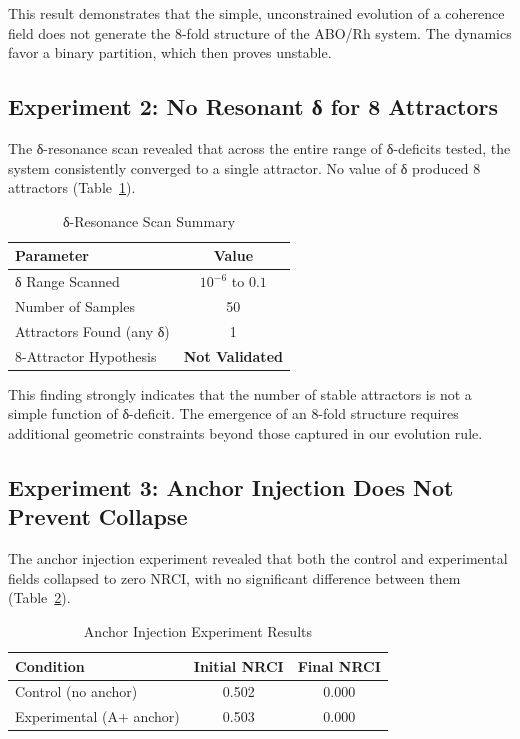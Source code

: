 \documentclass[11pt]{article}
\begin{document}
This result demonstrates that the simple, unconstrained evolution of a coherence field does not generate the 8-fold structure of the ABO/Rh system. The dynamics favor a binary partition, which then proves unstable.

\subsection{Experiment 2: No Resonant δ for 8 Attractors}

The δ-resonance scan revealed that across the entire range of δ-deficits tested, the system consistently converged to a single attractor. No value of δ produced 8 attractors (Table~\ref{tab:exp2_summary}).

\begin{table}[h!]
\centering
\caption{δ-Resonance Scan Summary}
\begin{tabular}{lc}
\toprule
\textbf{Parameter} & \textbf{Value} \\
\midrule
δ Range Scanned & $10^{-6}$ to $0.1$ \\
Number of Samples & 50 \\
Attractors Found (any δ) & 1 \\
8-Attractor Hypothesis & \textbf{Not Validated} \\
\bottomrule
\end{tabular}
\label{tab:exp2_summary}
\end{table}

This finding strongly indicates that the number of stable attractors is not a simple function of δ-deficit. The emergence of an 8-fold structure requires additional geometric constraints beyond those captured in our evolution rule.

\subsection{Experiment 3: Anchor Injection Does Not Prevent Collapse}

The anchor injection experiment revealed that both the control and experimental fields collapsed to zero NRCI, with no significant difference between them (Table~\ref{tab:exp3_summary}).

\begin{table}[h!]
\centering
\caption{Anchor Injection Experiment Results}
\begin{tabular}{lcc}
\toprule
\textbf{Condition} & \textbf{Initial NRCI} & \textbf{Final NRCI} \\
\midrule
Control (no anchor) & 0.502 & 0.000 \\
Experimental (A+ anchor) & 0.503 & 0.000 \\
\bottomrule
\end{tabular}
\label{tab:exp3_summary}
\end{table}
\end{document}
